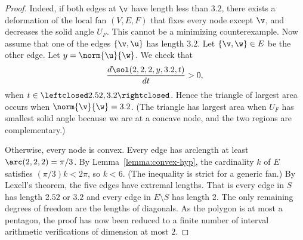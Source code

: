 \begin{proof}
  Indeed,%
 if both edges at $\v$ have length less than $3.2$, there
exists a deformation of the local fan $(V,E,F)$ that fixes every node
except $\v$, and decreases the solid angle $U_F$.  This cannot be a
minimizing counterexample.  Now assume that one of the edges
$\{\v,\u\}$ has length $3.2$.  Let $\{\v,\w\}\in E$ be the other edge.
Let
$y=\norm{\u}{\w}$.  We check that
\[
\dfrac{d\sol(2,2,2,y,3.2,t)}{dt} >0,
\]
when $t\in\leftclosed2.52,3.2\rightclosed$.  Hence the triangle of
largest area occurs when $\norm{\v}{\w}=3.2$.  (The triangle has
largest area when $U_F$ has smallest solid angle because we are at a
concave node, and the two regions are complementary.)


  Otherwise,
every node is convex.  Every edge has arclength at least
$\arc(2,2,2)=\pi/3$.  By Lemma~\ref{lemma:convex-hyp}, the cardinality
$k$ of $E$ satisfies $(\pi/3)k < 2\pi$, so $k<6$.  (The inequality is
strict for a generic fan.)  By Lexell's theorem, the five edges have
extremal lengths.  That is every edge in $S$ has length $2.52$ or
$3.2$ and every edge in $E\setminus S$ has length $2$.  The only
remaining degrees of freedom are the lengths of diagonals.  As the
polygon is at most a pentagon, the proof has now been reduced to a
finite number of interval arithmetic verifications of dimension at
most $2$.


\end{proof}
